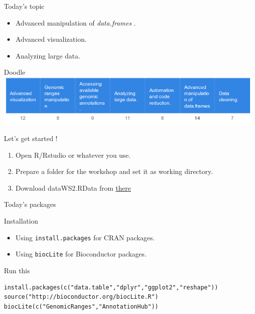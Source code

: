 \documentclass[10pt]{beamer}
\newcommand{\dfs}{{\it data.frames} }
\begin{document}
\begin{frame}{Today's topic}
  \begin{block}{}
    \begin{itemize}
    \item Advanced manipulation of \dfs.
    \item Advanced visualization.
    \item Analyzing large data.
    \end{itemize}
  \end{block}
  \begin{block}{Doodle}
    \includegraphics[width=\textwidth]{doodle-ws2.png}    
  \end{block}

  \begin{block}{Let's get started !}
    \begin{enumerate}
    \item Open R/Rstudio or whatever you use.
    \item Prepare a folder for the workshop and set it as working directory.
    \item Download {\sf dataWS2.RData} from \href{https://drive.google.com/open?id=0BwSxlHpMjRKtbUpqUGZOVkFFLUE}{\uline{there}}
    \end{enumerate}
  \end{block}
  
\end{frame}

\begin{frame}[fragile, shrink=10]{Today's packages}
  \begin{alertblock}{Installation}
    \begin{itemize}
    \item Using \verb!install.packages! for CRAN packages.
    \item Using \verb!biocLite! for Bioconductor packages.
    \end{itemize}
  \end{alertblock}
  \begin{exampleblock}{Run this}
\begin{verbatim}
install.packages(c("data.table","dplyr","ggplot2","reshape"))
source("http://bioconductor.org/biocLite.R")
biocLite(c("GenomicRanges","AnnotationHub"))
\end{verbatim}
  \end{exampleblock}
\end{frame}
\end{document}
